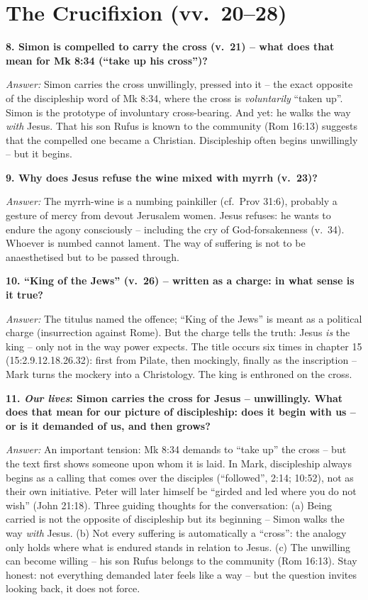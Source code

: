 \documentclass[12pt,a4paper]{article}
\newcommand{\frage}[1]{\par\vspace{0.7em}\noindent\textbf{#1}\par}
\newcommand{\antwort}[1]{\par\noindent\textit{Answer:} #1\par}
\begin{document}
\section*{The Crucifixion (vv.~20--28)}

\frage{8. Simon is \textbf{compelled} to carry the cross (v.~21) -- what does that mean for Mk 8:34 (``take up his cross'')?}
\antwort{Simon carries the cross unwillingly, pressed into it -- the exact opposite of the discipleship word of Mk 8:34, where the cross is \emph{voluntarily} ``taken up''. Simon is the prototype of involuntary cross-bearing. And yet: he walks the way \emph{with} Jesus. That his son Rufus is known to the community (Rom 16:13) suggests that the compelled one became a Christian. Discipleship often begins unwillingly -- but it begins.}

\frage{9. Why does Jesus refuse the wine mixed with myrrh (v.~23)?}
\antwort{The myrrh-wine is a numbing painkiller (cf.~Prov 31:6), probably a gesture of mercy from devout Jerusalem women. Jesus refuses: he wants to endure the agony consciously -- including the cry of God-forsakenness (v.~34). Whoever is numbed cannot lament. The way of suffering is not to be anaesthetised but to be passed through.}

\frage{10. ``King of the Jews'' (v.~26) -- written as a charge: in what sense is it true?}
\antwort{The titulus named the offence; ``King of the Jews'' is meant as a political charge (insurrection against Rome). But the charge tells the truth: Jesus \emph{is} the king -- only not in the way power expects. The title occurs six times in chapter 15 (15:2.9.12.18.26.32): first from Pilate, then mockingly, finally as the inscription -- Mark turns the mockery into a Christology. The king is enthroned on the cross.}

\frage{11. \emph{Our lives}: Simon carries the cross for Jesus -- unwillingly. What does that mean for our picture of discipleship: does it begin with us -- or is it demanded of us, and then grows?}
\antwort{An important tension: Mk 8:34 demands to ``take up'' the cross -- but the text first shows someone upon whom it is laid. In Mark, discipleship always begins as a calling that comes over the disciples (``followed'', 2:14; 10:52), not as their own initiative. Peter will later himself be ``girded and led where you do not wish'' (John 21:18). Three guiding thoughts for the conversation: (a) Being carried is not the opposite of discipleship but its beginning -- Simon walks the way \emph{with} Jesus. (b) Not every suffering is automatically a ``cross'': the analogy only holds where what is endured stands in relation to Jesus. (c) The unwilling can become willing -- his son Rufus belongs to the community (Rom 16:13). Stay honest: not everything demanded later feels like a way -- but the question invites looking back, it does not force.}
\end{document}
